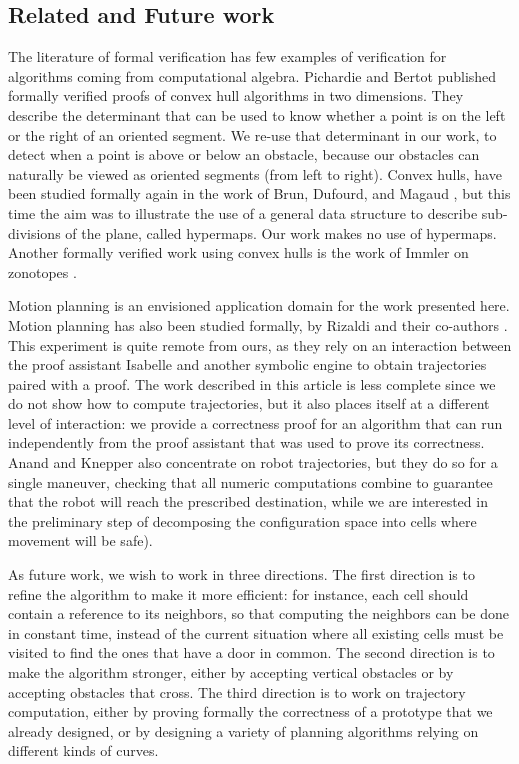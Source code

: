 \documentclass[a4paper, USenglish, cleveref, autoref, thm-restate, final]{lipics-v2021}
\begin{document}
\subsection{Related and Future work}
The literature of formal verification has few examples of verification for
algorithms coming from computational algebra.  Pichardie and Bertot
\cite{pichardie:hal-01702679} published
formally verified proofs of convex hull algorithms in two dimensions.  They
describe the determinant that can be used to know whether a point is on the
left or the right of an oriented segment.  We re-use that determinant in our
work, to detect when a point is above or below an obstacle, because our
obstacles can naturally be viewed as oriented segments (from left to right).
Convex hulls, have been studied formally again in the work of Brun, Dufourd,
and Magaud \cite{brun:hal-00955400}, but this time the aim was to illustrate
the use of a general data structure to describe sub-divisions of the plane,
called hypermaps.  Our work makes no use of hypermaps.  Another formally
verified work using convex hulls is the work of Immler on
zonotopes \cite{ImmlerZonotopes15}.

Motion planning is an envisioned application domain for the work presented
here.  Motion planning has also been studied formally, by Rizaldi and 
their co-authors \cite{Rizaldietal18}.  This experiment is quite remote from
ours, as they rely on an interaction between the proof assistant {\sc Isabelle}
and another symbolic engine to obtain trajectories paired with a proof.  The
work described in this article is less complete since we do not show how
to compute trajectories, but it also places itself at a different level of
interaction: we provide a correctness proof for an algorithm that can run
independently from the proof assistant that was used to prove its correctness.
Anand and Knepper \cite{AnandRoscoq15} also concentrate on robot
trajectories, but they do so for a single maneuver, checking that all
numeric computations combine to guarantee that the robot will reach the
prescribed destination, while we are interested in the preliminary step
of decomposing the configuration space into cells where movement will be safe).

As future work, we wish to work in three directions.  The first direction
is to refine the algorithm to make it more efficient: for instance,
each cell should contain a reference to its neighbors, so that computing
the neighbors can be done in constant time, instead of the current situation
where all existing cells must be visited to find the ones that have a door
in common.  The second direction is to make the algorithm stronger, either
by accepting vertical obstacles or by accepting obstacles that cross.
The third direction is to work on trajectory computation, either by proving
formally the correctness of a prototype that we already designed, or by
designing a variety of planning algorithms relying on different kinds
of curves.

\end{document}
